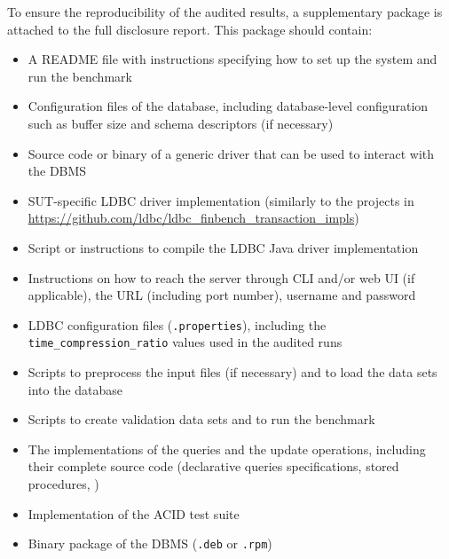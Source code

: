 To ensure the reproducibility of the audited results, a supplementary package is attached to the full disclosure report. This package should contain:

\begin{itemize}
    \item A README file with instructions specifying how to set up the system and run the benchmark
    \item Configuration files of the database, including database-level configuration such as buffer size and schema descriptors (if necessary)
    \item Source code or binary of a generic driver that can be used to interact with the DBMS
    \item SUT-specific LDBC driver implementation (similarly to the projects in \url{https://github.com/ldbc/ldbc_finbench_transaction_impls})
    \item Script or instructions to compile the LDBC Java driver implementation
    \item Instructions on how to reach the server through CLI and/or web UI (if applicable), \eg the URL (including port number), username and password
    \item LDBC configuration files (\texttt{.properties}), including the \texttt{time\_compression\_ratio} values used in the audited runs
    \item Scripts to preprocess the input files (if necessary) and to load the data sets into the database
    \item Scripts to create validation data sets and to run the benchmark
    \item The implementations of the queries and the update operations, including their complete source code (\eg declarative queries specifications, stored procedures, \etc)
    \item Implementation of the ACID test suite
    \item Binary package of the DBMS (\eg \texttt{.deb} or \texttt{.rpm})
\end{itemize}



